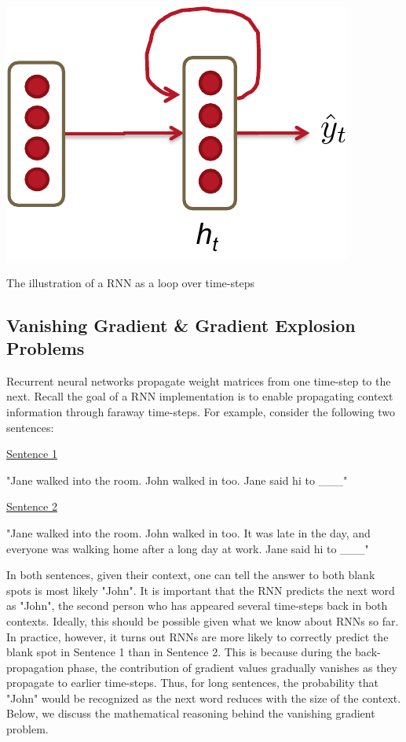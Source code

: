 \documentclass{tufte-handout}
\begin{document}
\begin{marginfigure}
	\centering
	\includegraphics[width=\linewidth]{rnn_loop.pdf}
	\caption {The illustration of a RNN as a loop over time-steps}
	\label{fig:rnn_loop}
\end{marginfigure}


\subsection{Vanishing Gradient \& Gradient Explosion Problems}
Recurrent neural networks propagate weight matrices from one time-step to the next. Recall the goal of a RNN implementation is to enable propagating context information through faraway time-steps. For example, consider the following two sentences:

\null
\centering
\uline{Sentence 1}

"Jane walked into the room. John walked in too. Jane said hi to \_\_\_"

\null
\uline{Sentence 2}

"Jane walked into the room. John walked in too. It was late in the day, and everyone was walking home after a long day at work. Jane said hi to \_\_\_"

\null
\justify
In both sentences, given their context, one can tell the answer to both blank spots is most likely "John". It is important that the RNN predicts the next word as "John", the second person who has appeared several time-steps back in both contexts. Ideally, this should be possible given what we know about RNNs so far. In practice, however, it turns out RNNs are more likely to correctly predict the blank spot in Sentence 1 than in Sentence 2. This is because during the back-propagation phase, the contribution of gradient values gradually vanishes as they propagate to earlier time-steps. Thus, for long sentences, the probability that "John" would be recognized as the next word reduces with the size of the context. Below, we discuss the mathematical reasoning behind the vanishing gradient problem.
\end{document}

